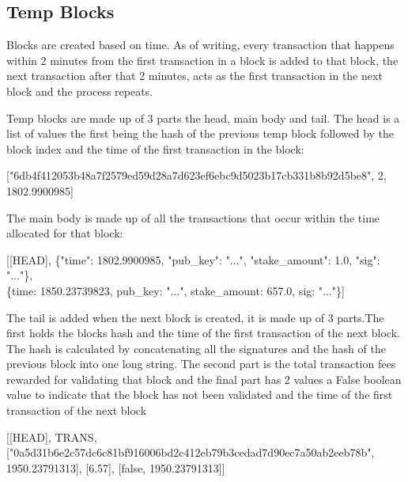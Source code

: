 \documentclass[11pt]{article}
\begin{document}
\subsection{Temp Blocks}
Blocks are created based on time. As of writing, every transaction that happens within 2 minutes from the first transaction in a block is added to that block, the next transaction after that 2 minutes, acts as the first transaction in the next block and the process repeats. 

Temp blocks are made up of 3 parts the head, main body and tail. The head is a list of values the first being the hash of the previous temp block followed by the block index and the time of the first transaction in the block:

\begin{center}
["6db4f412053b48a7f2579ed59d28a7d623ef6ebc9d5023b17cb331b8b92d5be8", 2, 1802.9900985]
\end{center}

The main body is made up of all the transactions that occur within the time allocated for that block:

\begin{center}
[[HEAD], \{"time": 1802.9900985, "pub\_key": "...", "stake\_amount": 1.0, "sig": "..."\},\\          \hspace{0.75cm}\{time: 1850.23739823,  pub\_key: "...",  stake\_amount: 657.0,  sig: "..."\}]
\end{center}

The tail is added when the next block is created, it is made up of 3 parts.The first holds the blocks hash and the time of the first transaction of the next block. The hash is calculated by concatenating all the signatures and the hash of the previous block into one long string. The second part is the total transaction fees rewarded for validating that block and the final part has 2 values a False boolean value to indicate that the block has not been validated and the time of the first transaction of the next block
 
\begin{center}
[[HEAD], TRANS, \\\hspace{0cm}["0a5d31b6e2c57dc6c81bf916006bd2c412eb79b3cedad7d90ec7a50ab2eeb78b", 1950.23791313], [6.57], [false, 1950.23791313]]
\end{center}
\end{document}
